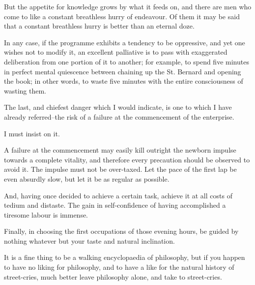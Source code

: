 But the appetite for knowledge grows by what it feeds on, and there are
men who come to like a constant breathless hurry of endeavour. Of them
it may be said that a constant breathless hurry is better than an
eternal doze.

In any case, if the programme exhibits a tendency to be oppressive, and
yet one wishes not to modify it, an excellent palliative is to pass
with exaggerated deliberation from one portion of it to another; for
example, to spend five minutes in perfect mental quiescence between
chaining up the St. Bernard and opening the book; in other words, to
waste five minutes with the entire consciousness of wasting them.

The last, and chiefest danger which I would indicate, is one to which I
have already referred--the risk of a failure at the commencement of the
enterprise.

I must insist on it.

A failure at the commencement may easily kill outright the newborn
impulse towards a complete vitality, and therefore every precaution
should be observed to avoid it.  The impulse must not be over-taxed.
Let the pace of the first lap be even absurdly slow, but let it be as
regular as possible.

And, having once decided to achieve a certain task, achieve it at all
costs of tedium and distaste.  The gain in self-confidence of having
accomplished a tiresome labour is immense.

Finally, in choosing the first occupations of those evening hours, be
guided by nothing whatever but your taste and natural inclination.

It is a fine thing to be a walking encyclopaedia of philosophy, but if
you happen to have no liking for philosophy, and to have a like for the
natural history of street-cries, much better leave philosophy alone,
and take to street-cries.

